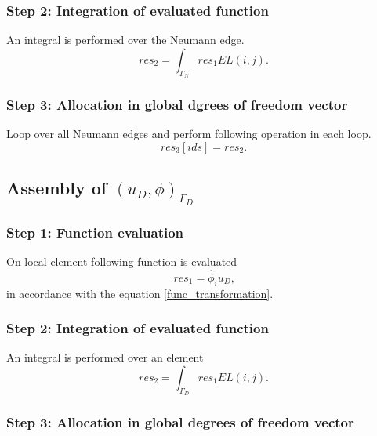 \documentclass[a4paper,twoside,openright]{book}
\begin{document}
\subsubsection{Step 2: Integration of evaluated function}

An integral is performed over the Neumann edge. 
\begin{equation}
res_2=\int_{\Gamma_N} res_1 EL(i,j) \textrm{.}
\end{equation}

\subsubsection{Step 3: Allocation in global dgrees of freedom vector}

Loop over all Neumann edges and perform following operation in each loop.
\begin{equation}
res_3[ids]=res_2 \textrm{.}
\end{equation}

\subsection{Assembly of $(u_D,\phi)_{\Gamma_D}$}

\subsubsection{Step 1: Function evaluation}

On local element following function is evaluated 
\begin{equation}
res_1=\hat{\phi}_i u_D \textrm{,}
\end{equation} 
in accordance with the equation \eqref{func_transformation}.

\subsubsection{Step 2: Integration of evaluated function}

An integral is performed over an element 
\begin{equation}
res_2=\int_{\Gamma_D} res_1 EL(i,j) \textrm{.}
\end{equation}

\subsubsection{Step 3: Allocation in global degrees of freedom vector}
\end{document}
